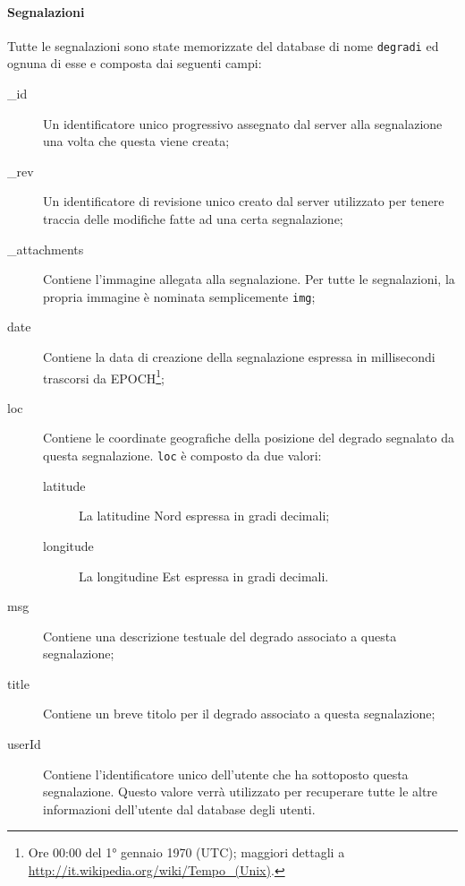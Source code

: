                 \paragraph{Segnalazioni}
                Tutte le segnalazioni sono state memorizzate del database di 
                nome \texttt{degradi} ed ognuna di esse e composta dai seguenti 
                campi:
                \begin{description}
                    \item[\_id] Un identificatore unico progressivo assegnato 
                    dal server alla segnalazione una volta che questa viene 
                    creata;
                    \item[\_rev] Un identificatore di revisione unico creato 
                    dal server utilizzato per tenere traccia delle modifiche 
                    fatte ad una certa segnalazione;
                    \item[\_attachments] Contiene l'immagine allegata alla 
                    segnalazione. Per tutte le segnalazioni, la propria 
                    immagine è nominata semplicemente \texttt{img};
                    \item[date] Contiene la data di creazione della 
                    segnalazione espressa in millisecondi trascorsi da 
                    EPOCH\footnote{Ore 00:00 del 1° gennaio 1970 (UTC); 
                    maggiori dettagli a 
                    \url{http://it.wikipedia.org/wiki/Tempo_(Unix)}.};
                    \item[loc] Contiene le coordinate geografiche della 
                    posizione del degrado segnalato da questa segnalazione. 
                    \texttt{loc} è composto da due valori:
                    \begin{description}
                        \item[latitude] La latitudine Nord espressa in gradi 
                        decimali;
                        \item[longitude] La longitudine Est espressa in gradi 
                        decimali.
                    \end{description}
                    \item[msg] Contiene una descrizione testuale del degrado 
                    associato a questa segnalazione;
                    \item[title] Contiene un breve titolo per il degrado 
                    associato a questa segnalazione;
                    \item[userId] Contiene l'identificatore unico dell'utente 
                    che ha sottoposto questa segnalazione. Questo valore verrà 
                    utilizzato per recuperare tutte le altre informazioni 
                    dell'utente dal database degli utenti.
                \end{description}
                

